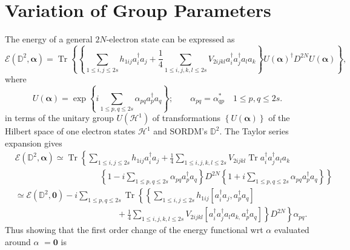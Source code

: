 \documentclass[aps,preprint]{revtex4}%
\begin{document}
\section{Variation of Group Parameters\label{VarGroupPar}}

The energy of a general $2N$-electron state can be expressed as
\begin{equation}
\mathcal{E}\left(  \mathbb{D}^{2},\bm{\alpha}\right)  =\operatorname{Tr}%
\left\{  \left\{  \sum_{1\leq i,j\leq2s}h_{1ij}a_{i}^{\dagger}a_{j}+\frac
{1}{4}\sum_{1\leq i,j,k,l\leq2s}V_{2ijkl}a_{i}^{\dagger}a_{j}^{\dagger}%
a_{l}a_{k}\right\}  U\left(  \bm{\alpha}\right)  ^{\dagger}D^{2N}U\left(
\bm{\alpha}\right)  \right\}  ,
\end{equation}
where
\begin{equation}
U\left(  \bm{\alpha}\right)  =\exp\left\{  i\sum_{1\leq p,q\leq2s}\alpha
_{pq}a_{p}^{\dagger}a_{q}\right\}  ;\qquad\alpha_{pq}=\alpha_{qp}^{\ast}%
\quad1\leq p,q\leq2s.
\end{equation}
in terms of the unitary group $U\left(  \mathcal{H}^{1}\right)  $ of
transformations $\left\{  U\left(  \bm{\alpha}\right)  \right\}  $ of the
Hilbert space of one electron states $\mathcal{H}^{1}$ and SORDM's
$\mathbb{D}^{2}$. The Taylor series expansion gives
\begin{align}
&  \mathcal{E}\left(  \mathbb{D}^{2},\bm{\alpha}\right)  \simeq
\operatorname{Tr}\left\{  \sum_{1\leq i,j\leq2s}h_{1ij}a_{i}^{\dagger}%
a_{j}+\frac{1}{4}\sum_{1\leq i,j,k,l\leq2s}V_{2ijkl}\operatorname{Tr}%
a_{i}^{\dagger}a_{j}^{\dagger}a_{l}a_{k}\right. \nonumber\\
&  \qquad\qquad\qquad\qquad\qquad\left.  \left\{  1-i\sum_{1\leq p,q\leq
2s}\alpha_{pq}a_{p}^{\dagger}a_{q}\right\}  D^{2N}\left\{  1+i\sum_{1\leq
p,q\leq2s}\alpha_{pq}a_{p}^{\dagger}a_{q}\right\}  \right\} \nonumber\\
&  \simeq\mathcal{E}\left(  \mathbb{D}^{2},\bm{0}\right)  -i\sum_{1\leq
p,q\leq2s}\operatorname{Tr}\left\{  \left\{  \sum_{1\leq i,j\leq2s}%
h_{1ij}\left[  a_{i}^{\dagger}a_{j},a_{p}^{\dagger}a_{q}\right]  \right.
\right. \nonumber\\
&  \qquad\qquad\qquad\qquad\qquad\qquad+\left.  \left.  \frac{1}{4}\sum_{1\leq
i,j,k,l\leq2s}V_{2ijkl}\left[  a_{i}^{\dagger}a_{j}^{\dagger}a_{l}a_{k,}%
a_{p}^{\dagger}a_{q}\right]  \right\}  D^{2N}\right\}  \alpha_{pq}.
\end{align}
Thus showing that the first order change of the energy functional wrt
\textbf{$\alpha$} evaluated around \textbf{$\alpha$ }$=\bm{0}$ is
\end{document}
